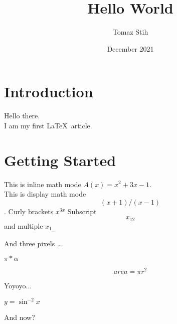 \documentclass[12pt]{article}
\title{Hello World}
\author{Tomaz Stih}
\date{December 2021}
\begin{document}
\maketitle

\section {Introduction}

Hello there.\\
I am my first \LaTeX\ article. 

\section {Getting Started}

This is inline math mode $A(x)=x^2+3x-1$.\\
This is display math mode $$(x+1)/(x-1)$$.
Curly brackets $x^{3x}$
Subscript $$x_{12}$$ and multiple $x_{1_{\ldots}}$

And three pixels \ldots. 

$\pi*\alpha$

$$area = \pi r^2$$



Yoyoyo...

$y=\sin^{-2} x$

And now?
\end{document}

